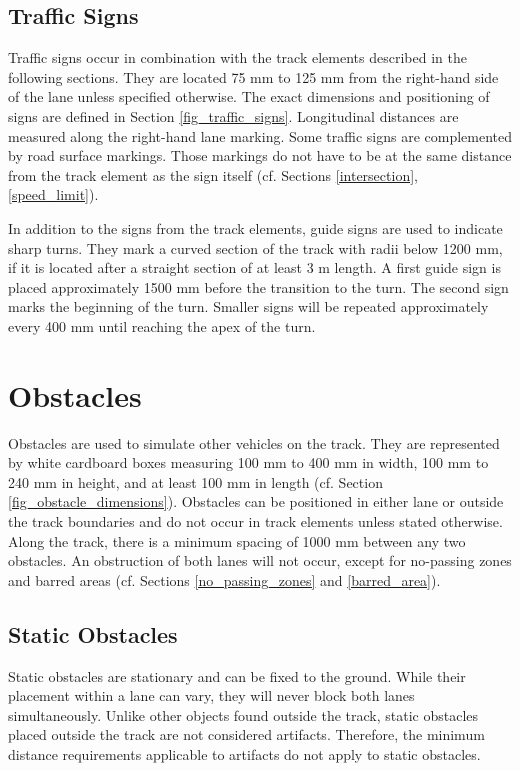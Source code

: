 \subsection{Traffic Signs}
\label{traffic_signs}

Traffic signs occur in combination with the track elements described in the following sections.
They are located 75 mm to 125 mm from the right-hand side of the lane unless specified otherwise.
The exact dimensions and positioning of signs are defined in Section \ref{fig_traffic_signs}.
Longitudinal distances are measured along the right-hand lane marking.
Some traffic signs are complemented by road surface markings.
Those markings do not have to be at the same distance from the track element as the sign itself (cf. Sections \ref{intersection}, \ref{speed_limit}).

In addition to the signs from the track elements, guide signs are used to indicate sharp turns.
They mark a curved section of the track with radii below 1200 mm, if it is located after a straight section of at least 3 m length.
A first guide sign is placed approximately 1500 mm before the transition to the turn.
The second sign marks the beginning of the turn.
Smaller signs will be repeated approximately every 400 mm until reaching the apex of the turn.

\section{Obstacles}
\label{obstacles}

Obstacles are used to simulate other vehicles on the track.
They are represented by white cardboard boxes measuring 100 mm to 400 mm in width, 100 mm to 240 mm in height, and at least 100 mm in length (cf. Section \ref{fig_obstacle_dimensions}).
Obstacles can be positioned in either lane or outside the track boundaries and do not occur in track elements unless stated otherwise.
Along the track, there is a minimum spacing of 1000 mm between any two obstacles.
An obstruction of both lanes will not occur, except for no-passing zones and barred areas (cf. Sections \ref{no_passing_zones} and \ref{barred_area}).

\subsection{Static Obstacles}
\label{static_obstacle}

Static obstacles are stationary and can be fixed to the ground.
While their placement within a lane can vary, they will never block both lanes simultaneously.
Unlike other objects found outside the track, static obstacles placed outside the track are not considered artifacts.
Therefore, the minimum distance requirements applicable to artifacts do not apply to static obstacles.

